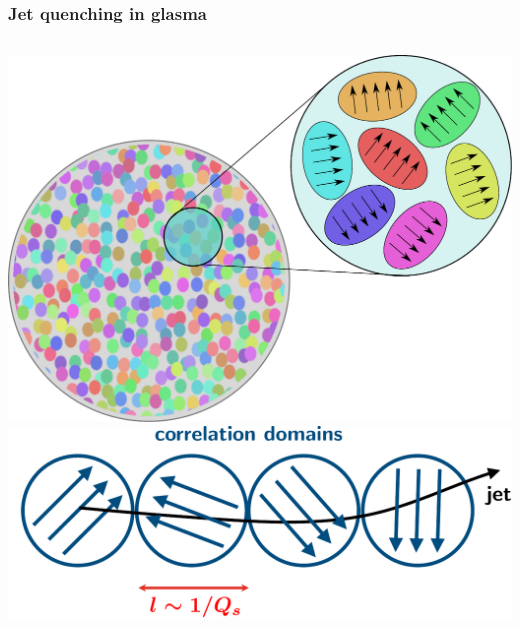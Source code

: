 \documentclass[aspectratio=169,11pt,usenames,dvipsnames]{beamer}
\begin{document}

\begin{frame}
    \frametitle{Jet quenching in glasma}
    \vspace{-15pt}
    \begin{center}
        \begin{columns}[onlytextwidth,t]
            \vspace{5pt}
            \begin{center}
                \includegraphics[width=0.88\columnwidth]{images/target_domains.pdf}
                \\[5pt]
                \includegraphics[width=0.88\columnwidth]{images/glasma_corr_dom_jet.pdf}
            \end{center}


\end{columns}
\end{center}
\end{frame}
\end{document}
